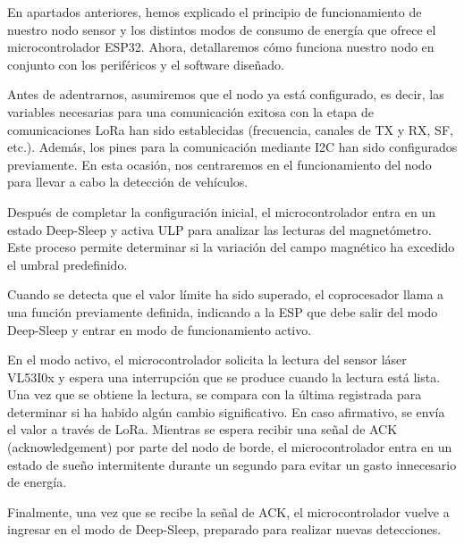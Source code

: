 En apartados anteriores, hemos explicado el principio de funcionamiento de nuestro nodo
sensor y los distintos modos de consumo de energía que ofrece el microcontrolador ESP32.
Ahora, detallaremos cómo funciona nuestro nodo en conjunto con los periféricos y el
software diseñado.

Antes de adentrarnos, asumiremos que el nodo ya está configurado, es decir, las
variables necesarias para una comunicación exitosa con la etapa de comunicaciones LoRa
han sido establecidas (frecuencia, canales de TX y RX, SF, etc.). Además, los pines para
la comunicación mediante I2C han sido configurados previamente. En esta ocasión, nos
centraremos en el funcionamiento del nodo para llevar a cabo la detección de vehículos.


Después de completar la configuración inicial, el microcontrolador entra en un estado
Deep-Sleep y activa ULP para analizar las lecturas del magnetómetro. Este proceso
permite determinar si la variación del campo magnético ha excedido el umbral predefinido.


Cuando se detecta que el valor límite ha sido superado, el coprocesador llama a una
función previamente definida, indicando a la ESP que debe salir del modo Deep-Sleep y
entrar en modo de funcionamiento activo.

En el modo activo, el microcontrolador solicita la lectura del sensor láser VL53I0x y
espera una interrupción que se produce cuando la lectura está lista. Una vez que se
obtiene la lectura, se compara con la última registrada para determinar si ha habido
algún cambio significativo. En caso afirmativo, se envía el valor a través de LoRa.
Mientras se espera recibir una señal de ACK (acknowledgement) por parte del nodo de
borde, el microcontrolador entra en un estado de sueño intermitente durante un segundo
para evitar un gasto innecesario de energía.

Finalmente, una vez que se recibe la señal de ACK, el microcontrolador vuelve a ingresar
en el modo de Deep-Sleep, preparado para realizar nuevas detecciones.

